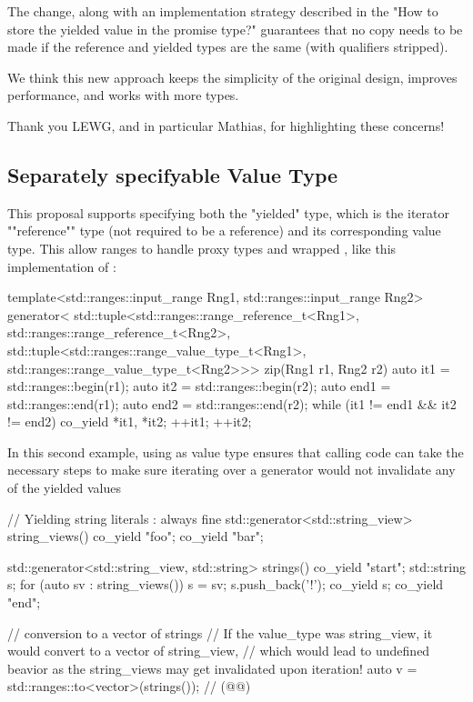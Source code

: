 \documentclass{wg21}
\begin{document}
The change, along with an implementation strategy described in the "How to store the yielded value in the promise type?" guarantees that
no copy needs to be made if the reference and yielded types are the same (with qualifiers stripped).

We think this new approach keeps the simplicity of the original design, improves performance, and works with more types.

Thank you LEWG, and in particular Mathias, for highlighting these concerns!

\subsection{Separately specifyable Value Type}

This proposal supports specifying both the "yielded" type, which is the iterator ""reference"" type (not required to be a reference) and its corresponding value type.
This allow ranges to handle proxy types and wrapped , like this implementation of :

\begin{colorblock}
    template<std::ranges::input_range Rng1,
    std::ranges::input_range Rng2>
    generator<
    std::tuple<std::ranges::range_reference_t<Rng1>,
    std::ranges::range_reference_t<Rng2>,
    std::tuple<std::ranges::range_value_type_t<Rng1>,
    std::ranges::range_value_type_t<Rng2>>>
    zip(Rng1 r1, Rng2 r2) {
        auto it1 = std::ranges::begin(r1);
        auto it2 = std::ranges::begin(r2);
        auto end1 = std::ranges::end(r1);
        auto end2 = std::ranges::end(r2);
        while (it1 != end1 && it2 != end2) {
            co_yield {*it1, *it2};
            ++it1; ++it2;
        }
    }
\end{colorblock}

In this second example, using  as value type ensures that calling code can take the necessary steps
to make sure iterating over a generator would not invalidate any of the yielded values

\begin{colorblock}

// Yielding string literals : always fine
std::generator<std::string_view> string_views() {
    co_yield "foo";
    co_yield "bar";
}

std::generator<std::string_view, std::string> strings() {
    co_yield "start";
    std::string s;
    for (auto sv : string_views()) {
        s = sv;
        s.push_back('!');
        co_yield s;
    }
    co_yield "end";
}

// conversion to a vector of strings
// If the value_type was string_view, it would convert to a vector of string_view,
// which would lead to undefined beavior as the string_views may get invalidated upon iteration!
auto v = std::ranges::to<vector>(strings()); // (@{}@)

\end{colorblock}
\end{document}
